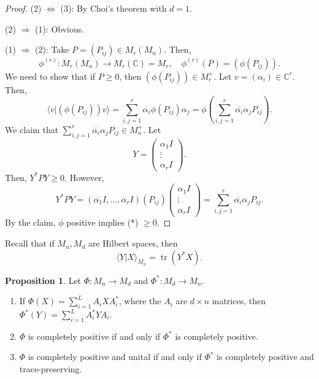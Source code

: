 \documentclass[12pt]{article}
\theoremstyle{definition}
\newtheorem*{proposition}{Proposition}
\DeclareMathOperator{\tr}{tr}
\newcommand{\C}{\mathbb{C}}
\begin{document}
\begin{proof}
(2) $\Leftrightarrow$ (3): By Choi's theorem with $d=1$.

(2) $\Rightarrow$ (1): Obvious.

(1) $\Rightarrow$ (2): Take $P=(P_{ij}) \in M_r(M_n)$. Then,
\[
\phi^{(r)} : M_r(M_n) \to M_r(\C)=M_r, \quad \phi^{(r)}(P)=(\phi(P_{ij})).
\]
We need to show that if $P \geq 0$, then $(\phi(P_{ij})) \in M_r^+$. Let $v=(\alpha_i) \in \C^r$. Then,
\[
\langle v|(\phi(P_{ij}))v\rangle = \sum_{i,j=1}^r \overline{\alpha_i}\phi(P_{ij})\alpha_j = \phi\left(\sum_{i,j=1}^r \overline{\alpha_i}\alpha_jP_{ij}\right). \tag{*}
\]
We claim that $\sum_{i,j=1}^r \overline{\alpha_i}\alpha_jP_{ij} \in M_n^+$. Let
\[
Y = \begin{pmatrix}\alpha_1I\\ \vdots \\ \alpha_rI\end{pmatrix}.
\]
Then, $Y^*PY \geq 0$. However,
\[
Y^*PY = (\overline{\alpha_1}I,\ldots,\overline{\alpha_r}I)(P_{ij})\begin{pmatrix}\alpha_1I\\ \vdots \\ \alpha_rI\end{pmatrix} = \sum_{i,j=1}^r \overline{\alpha_i}\alpha_jP_{ij}.
\]
By the claim, $\phi$ positive implies (*) $\geq 0$.
\end{proof}

Recall that if $M_n,M_d$ are Hilbert spaces, then
\[
\langle Y|X\rangle_{M_n} = \tr(Y^*X).
\]

\begin{proposition}
Let $\Phi:M_n \to M_d$ and $\Phi^*:M_d \to M_n$.
\begin{enumerate}
\item If $\Phi(X)=\sum_{i=1}^L A_iXA_i^*$, where the $A_i$ are $d \times n$ matrices, then $\Phi^*(Y)=\sum_{i=1}^L A_i^*YA_i$.
\item $\Phi$ is completely positive if and only if $\Phi^*$ is completely positive.
\item $\Phi$ is completely positive and unital if and only if $\Phi^*$ is completely positive and trace-preserving.
\end{enumerate}
\end{proposition}
\end{document}
